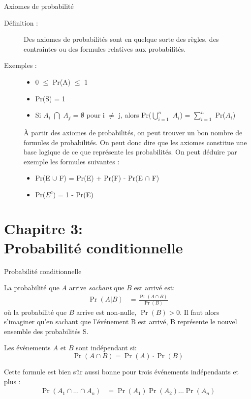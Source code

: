 \documentclass[10pt, french]{article}
\begin{document}
\begin{multicols*}{2}
\begin{axioms}{Axiomes de probabilité}
\begin{description}
  \item[Définition :] Des axiomes de probabilités sont en quelque sorte des règles, des contraintes ou des formules relatives aux probabilités.
  \item[Exemples :]
  \begin{itemize}
  \item 0 $\le$ Pr(A) $\le$ 1
  \item Pr(S) = 1
  \item Si $A_i$ $\bigcap$ $A_j$ = $\emptyset$ pour i $\neq$ j, alors Pr($\bigcup_{i = 1}^{n}$ $A_i$) = $\sum_{i = 1}^{n}$ Pr($A_i$)
  \end{itemize}
  À partir des axiomes de probabilités, on peut trouver un bon nombre de formules de probabilités. On peut donc dire que les axiomes constitue une base logique de ce que représente les probabilités. On peut déduire par exemple les formules suivantes :
  \begin{itemize}
  \item Pr(E $\cup$ F) = Pr(E) + Pr(F) - Pr(E $\cap$ F)
  \item Pr($E^{c}$) = 1 - Pr(E)
  \end{itemize}
\end{description}
\end{axioms}

\pagebreak
\section{Chapitre 3:\\ Probabilité conditionnelle}
\begin{probch3}{Probabilité conditionnelle}
\begin{description}
	\item[Conditionnel:]	La probabilité que $A$ arrive \textit{sachant} que $B$ est arrivé est: 
	\begin{align*}
		\Pr(A | B) 
		&= 	\frac{\Pr(A \cap B)}{\Pr(B)}	
	\end{align*}
	où la probabilité que $B$ arrive est non-nulle, $\Pr(B) > 0$. Il faut alors s'imaginer qu'en sachant que l'événement B est arrivé, B représente le nouvel ensemble des probabilités S.
	\item[Indépendant:]	Les événements $A$ et $B$ sont indépendant si:
	\begin{equation*}
		\Pr(A \cap B) = \Pr(A) \cdot \Pr(B)
	\end{equation*}
	\item Cette formule est bien sûr aussi bonne pour trois événements indépendants et plus : 
	\setlength{\mathindent}{-1cm}
	\begin{align*}
	\Pr(A_{1} \cap \dots \cap A_{n}) 
	  &= \Pr(A_{1}) \Pr(A_{2}) \dots \Pr(A_{n})
	\end{align*}
\end{description}


\end{probch3}
\end{multicols*}
\end{document}
